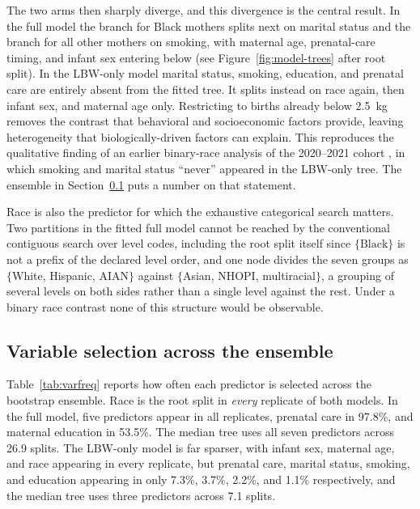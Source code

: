 \documentclass[AMA]{USG}
\begin{document}
The two arms then sharply diverge, and this divergence is the central result. In the full model the branch for Black mothers splits next on marital status and the branch for all other mothers on smoking, with maternal age, prenatal-care timing, and infant sex entering below (see Figure~\ref{fig:model-trees} after root split). In the LBW-only model marital status, smoking, education, and prenatal care are entirely absent from the fitted tree. It splits instead on race again, then infant sex, and maternal age only. Restricting to births already below 2.5~kg removes the contrast that behavioral and socioeconomic factors provide, leaving heterogeneity that biologically-driven factors can explain. This reproduces the qualitative finding of an earlier binary-race analysis of the 2020--2021 cohort \cite{kurth-thesis2025}, in which smoking and marital status ``never'' appeared in the LBW-only tree. The ensemble in Section~\ref{sec:results-ensemble} puts a number on that statement.


Race is also the predictor for which the exhaustive categorical search matters. Two partitions in the fitted full model cannot be reached by the conventional contiguous search over level codes, including the root split itself since $\{\text{Black}\}$ is not a prefix of the declared level order, and one node divides the seven groups as $\{$White, Hispanic, AIAN$\}$ against $\{$Asian, NHOPI, multiracial$\}$, a grouping of several levels on both sides rather than a single level against the rest. Under a binary race contrast none of this structure would be observable.

\subsection{Variable selection across the ensemble}
\label{sec:results-ensemble}

Table~\ref{tab:varfreq} reports how often each predictor is selected across the bootstrap ensemble. Race is the root split in \emph{every} replicate of both models. In the full model, five predictors appear in all replicates, prenatal care in 97.8\%, and maternal education in 53.5\%. The median tree uses all seven predictors across 26.9 splits. The LBW-only model is far sparser, with infant sex, maternal age, and race appearing in every replicate, but prenatal care, marital status, smoking, and education appearing in only 7.3\%, 3.7\%, 2.2\%, and 1.1\% respectively, and the median tree uses three predictors across 7.1 splits.

\end{document}
